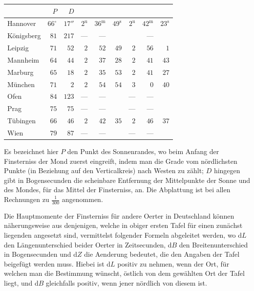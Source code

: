 \begin{center}\small\setlength{\tabcolsep}{3pt}
\begin{tabular}{l|r|r|rrr|rrr}
  &  $P$  &  $D$  &    &    \\
\hline
 Hannover  &  $66^\circ$  &  $17''$  &  $2^{\mathrm u}$  &  $36^{\mathrm m}$  &  $49^{\mathrm s}$  &  $2^{\mathrm u}$  &  $42^{\mathrm m}$  &  $23^{\mathrm s}$ \\
 Königsberg  &  $81$  &  $217$  &  ---  &  ---  &   &  & --- &  \\
 Leipzig  &  $71$  &  $52$  &  $2$  &  $52$  &  $49$  &  $2$  &  $56$  &  $1$ \\
 Mannheim  &  $64$  &  $44$  &  $2$  &  $37$  &  $28$  &  $2$  &  $41$  &  $43$ \\
 Marburg  &  $65$  &  $18$  &  $2$  &  $35$  &  $53$  &  $2$  &  $41$  &  $27$ \\
 München  &  $71$  &  $2$  &  $2$  &  $54$  &  $54$  &  $3$  &  $0$  &  $40$ \\
 Ofen  &  $84$  &  $123$  &  ---  &  ---  &   &  ---  &  ---  &  \\
 Prag  &  $75$  &  $75$  &  ---  &  ---  &   &  ---  &  ---  &  \\
 Tübingen  &  $66$  &  $46$  &  $2$  &  $42$  &  $35$  &  $2$  &  $46$  &  $37$ \\
 Wien  &  $79$  &  $87$  &  ---  &  ---  &   &  ---  &  ---  &  \\
\end{tabular}
\end{center}

Es bezeichnet hier $P$ den Punkt des Sonnenrandes, wo beim Anfang der Finsterniss der Mond zuerst eingreift, indem man die Grade vom nördlichsten Punkte (in Beziehung auf den Verticalkreis) nach  Westen zu zählt; $D$ hingegen gibt in Bogensecunden die scheinbare Entfernung der Mittelpunkte der Sonne und des Mondes, für das Mittel der Finsterniss, an. Die Abplattung ist bei allen Rechnungen zu $\tfrac{1}{300}$ angenommen.

Die Hauptmomente der Finsterniss für andere Oerter in Deutschland können näherungsweise aus denjenigen, welche in obiger ersten Tafel für einen zunächst liegenden angesetzt sind, vermittelst folgender Formeln abgeleitet werden, wo d$L$ den Längenunterschied beider Oerter in Zeitsecunden, d$B$ den Breitenunterschied in Bogensecunden und d$Z$ die Aenderung bedeutet, die den Angaben der Tafel beigefügt werden muss. Hiebei ist d$L$ positiv zu nehmen, wenn der Ort, für welchen man die Bestimmung wünscht, östlich von dem gewählten Ort der Tafel liegt, und d$B$ gleichfalls positiv, wenn jener nördlich von diesem ist.

